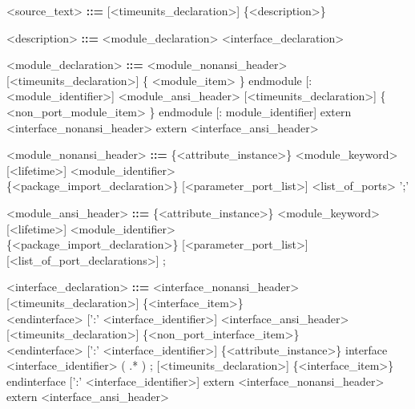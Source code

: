 \documentclass{article}
\begin{document}
\begin{grammar}
    <source_text> \textbf{::=} [<timeunits_declaration>] \{<description>\}
\end{grammar}

\begin{grammar}
    <description> \textbf{::=} <module_declaration>
                               \alt <interface_declaration>
\end{grammar}

\begin{grammar}
    <module_declaration> \textbf{::=} <module_nonansi_header> [<timeunits_declaration>] \{ <module_item> \} endmodule
                                      [: <module_identifier>]
                                      \alt <module_ansi_header> [<timeunits_declaration>] \{ <non_port_module_item> \} endmodule
                                      [: module_identifier]
                                      \alt extern <interface_nonansi_header>
                                      \alt extern <interface_ansi_header>
\end{grammar}

\begin{grammar}
    <module_nonansi_header> \textbf{::=} \{<attribute_instance>\} <module_keyword> [<lifetime>] <module_identifier> \\
                                         \{<package_import_declaration>\} [<parameter_port_list>] <list_of_ports> ';'
\end{grammar}

\begin{grammar}
    <module_ansi_header> \textbf{::=} \{<attribute_instance>\} <module_keyword> [<lifetime>] <module_identifier> \\
                                      \{<package_import_declaration>\} [<parameter_port_list>] [<list_of_port_declarations>] ;
\end{grammar}

\begin{grammar}
    <interface_declaration> \textbf{::=} <interface_nonansi_header> [<timeunits_declaration>] \{<interface_item>\} \\
                                         <endinterface> [':' <interface_identifier>]
                                         \alt <interface_ansi_header> [<timeunits_declaration>] \{<non_port_interface_item>\} \\
                                         <endinterface> [':' <interface_identifier>]
                                         \alt \{<attribute_instance>\} interface <interface_identifier> ( .* ) ;
                                         [<timeunits_declaration>] \{<interface_item>\} endinterface [':' <interface_identifier>]
                                         \alt extern <interface_nonansi_header>
                                         \alt extern <interface_ansi_header>
\end{grammar}
\end{document}
